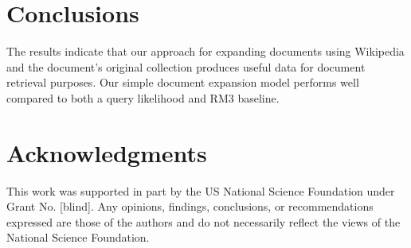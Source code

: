 \documentclass{sig-alternate}
\begin{document}
\section{Conclusions}\label{section.conclusions}

The results indicate that our approach for expanding documents using Wikipedia and the document's original collection produces useful data for document retrieval purposes. Our simple document expansion model performs well compared to both a query likelihood and RM3 baseline.

\section{Acknowledgments}\label{section.acknowledgments}
This work was supported in part by the US National Science Foundation under Grant No. [blind]. Any opinions, findings, conclusions, or recommendations expressed are those of the authors and do not necessarily reflect the views of the National Science Foundation.



  
\end{document}
